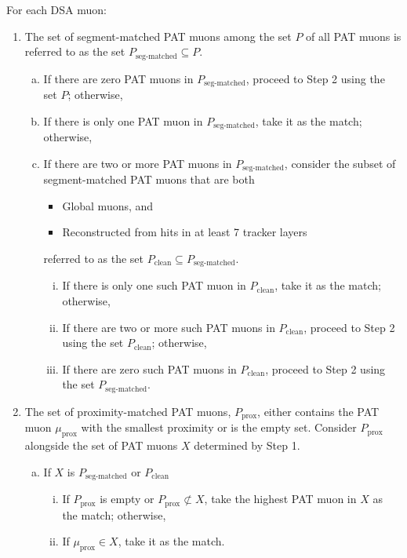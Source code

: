 For each DSA muon:
\begin{enumerate}
  \item The set of segment-matched PAT muons among the set $P$ of all PAT muons is referred to as the set $P_\text{seg-matched} \subseteq P$.
    \begin{enumerate}[a.]
      \item If there are zero PAT muons in $P_\text{seg-matched}$, proceed to Step 2 using the set $P$; otherwise,
      \item If there is only one PAT muon in $P_\text{seg-matched}$, take it as the match; otherwise,
      \item If there are two or more PAT muons in $P_\text{seg-matched}$, consider the subset of segment-matched PAT muons that are both
        \begin{itemize}
          \item Global muons, and
          \item Reconstructed from hits in at least 7 tracker layers
        \end{itemize}
        referred to as the set $P_\text{clean} \subseteq P_\text{seg-matched}$.
        \begin{enumerate}[i.]
          \item If there is only one such PAT muon in $P_\text{clean}$, take it as the match; otherwise,
          \item If there are two or more such PAT muons in $P_\text{clean}$, proceed to Step 2 using the set $P_\text{clean}$; otherwise,
          \item If there are zero such PAT muons in $P_\text{clean}$, proceed to Step 2 using the set $P_\text{seg-matched}$.
        \end{enumerate}
    \end{enumerate}
  \item The set of proximity-matched PAT muons, $P_\text{prox}$, either contains the PAT muon $\mu_\text{prox}$ with the smallest proximity \deltaR or is the empty set. Consider $P_\text{prox}$ alongside the set of PAT muons $X$ determined by Step 1.
    \begin{enumerate}[a.]
      \item If $X$ is $P_\text{seg-matched}$ or $P_\text{clean}$
        \begin{enumerate}[i.]
          \item If $P_\text{prox}$ is empty or $P_\text{prox} \not\subset X$, take the highest \pT PAT muon in $X$ as the match; otherwise,
          \item If $\mu_\text{prox} \in X$, take it as the match.

\end{enumerate}
\end{enumerate}
\end{enumerate}
